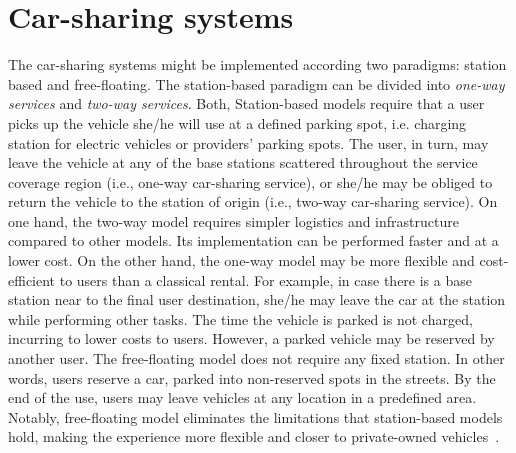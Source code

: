 \section{Car-sharing systems} 
\label{sec:4_2_carsharing}


The car-sharing systems might be implemented according two paradigms: station based and  free-floating. The station-based paradigm can be divided into \textit{one-way services} and \textit{two-way services}. Both, Station-based models require that a user picks up the vehicle she/he will use at a defined parking spot, i.e. charging station for electric vehicles or providers' parking spots. The user, in turn, may leave the vehicle at any of the base stations scattered throughout the service coverage region (i.e., one-way car-sharing service), or she/he may be obliged to return the vehicle to the station of origin (i.e., two-way car-sharing service). On one hand, the two-way model requires simpler logistics and infrastructure compared to other models. Its implementation can be performed faster and at a lower cost. 
On the other hand, the one-way model may be more flexible and cost-efficient to users than a classical rental. For example, in case there is a base station near to the final user destination, she/he may leave the car at the station while performing other tasks. The time the vehicle is parked is not charged, incurring to lower costs to users. However, a parked vehicle may be reserved by another user. 
The free-floating model does not require any fixed station. In other words, users reserve a car, parked into non-reserved spots in the streets. By the end of the use, users may leave vehicles at any location in a predefined area. Notably, free-floating model eliminates the limitations that station-based models hold, making the experience more flexible and closer to private-owned vehicles~\cite{ciari2014modeling}.

